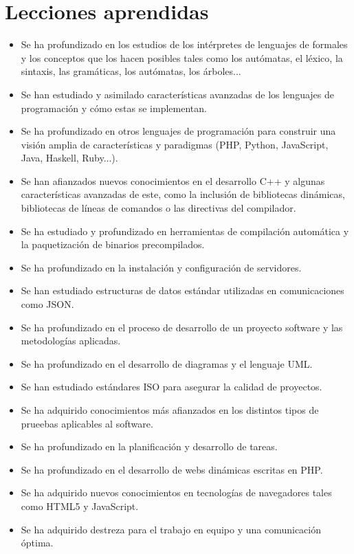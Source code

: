 \section{Lecciones aprendidas}
\begin{itemize}
\item Se ha profundizado en los estudios de los intérpretes de lenguajes de formales y los conceptos que los hacen posibles tales como 
los autómatas, el léxico, la sintaxis, las gramáticas, los autómatas, los árboles...
\item Se han estudiado y asimilado características avanzadas de los lenguajes de programación y cómo estas se implementan.
\item Se ha profundizado en otros lenguajes de programación para construir una visión amplia de características y paradigmas (PHP, Python, JavaScript, Java, Haskell, Ruby...). 
\item Se han afianzados nuevos conocimientos en el desarrollo C++ y algunas características avanzadas de este, como la inclusión de bibliotecas dinámicas, bibliotecas 
de líneas de comandos o las directivas del compilador.
\item Se ha estudiado y profundizado en herramientas de compilación automática y la paquetización de binarios precompilados.
\item Se ha profundizado en la instalación y configuración de servidores.
\item Se han estudiado estructuras de datos estándar utilizadas en comunicaciones como JSON.
\item Se ha profundizado en el proceso de desarrollo de un proyecto software y las metodologías aplicadas.
\item Se ha profundizado en el desarrollo de diagramas y el lenguaje UML.
\item Se han estudiado estándares ISO para asegurar la calidad de proyectos.
\item Se ha adquirido conocimientos más afianzados en los distintos tipos de prueebas aplicables al software.
\item Se ha profundizado en la planificación y desarrollo de tareas.
\item Se ha profundizado en el desarrollo de webs dinámicas escritas en PHP.
\item Se ha adquirido nuevos conocimientos en tecnologías de navegadores tales como HTML5 y JavaScript.
\item Se ha adquirido destreza para el trabajo en equipo y una comunicación óptima.
\end{itemize}


